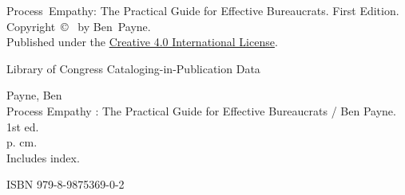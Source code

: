 \thispagestyle{empty}

\noindent Process~Empathy: The Practical Guide for Effective Bureaucrats. First Edition. \\Copyright~\copyright~\the\year{}
 by Ben~Payne. \\
Published under the \href{https://creativecommons.org/licenses/by-nc/4.0/}{Creative 
\iftoggle{narrowpage}{Commons Attribution-\\NonCommercial}{Commons Attribution-NonCommercial}
4.0 International License}.




\vspace*{\fill}



\noindent Library of Congress Cataloging-in-Publication Data

\noindent Payne, Ben\\
Process Empathy : The Practical Guide for Effective Bureaucrats / Ben Payne. 1st ed.\\
p. cm.\\
Includes index.

\noindent ISBN 979-8-9875369-0-2
